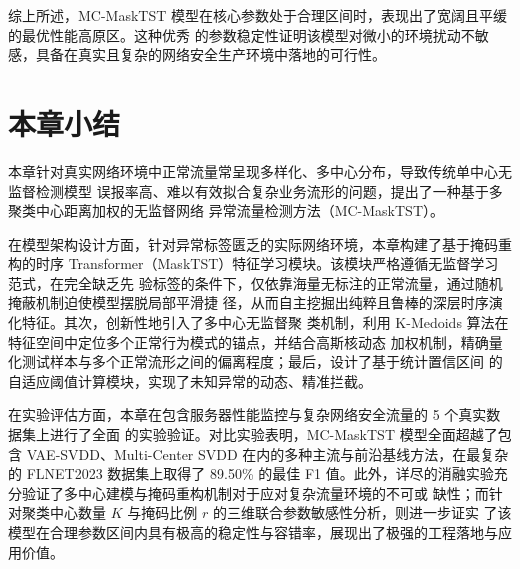 综上所述，MC-MaskTST 模型在核心参数处于合理区间时，表现出了宽阔且平缓的最优性能高原区。这种优秀
的参数稳定性证明该模型对微小的环境扰动不敏感，具备在真实且复杂的网络安全生产环境中落地的可行性。

\section{本章小结}
本章针对真实网络环境中正常流量常呈现多样化、多中心分布，导致传统单中心无监督检测模型
误报率高、难以有效拟合复杂业务流形的问题，提出了一种基于多聚类中心距离加权的无监督网络
异常流量检测方法（MC-MaskTST）。

在模型架构设计方面，针对异常标签匮乏的实际网络环境，本章构建了基于掩码重构的时序 
Transformer（MaskTST）特征学习模块。该模块严格遵循无监督学习范式，在完全缺乏先
验标签的条件下，仅依靠海量无标注的正常流量，通过随机掩蔽机制迫使模型摆脱局部平滑捷
径，从而自主挖掘出纯粹且鲁棒的深层时序演化特征。其次，创新性地引入了多中心无监督聚
类机制，利用 K-Medoids 算法在特征空间中定位多个正常行为模式的锚点，并结合高斯核动态
加权机制，精确量化测试样本与多个正常流形之间的偏离程度；最后，设计了基于统计置信区间
的自适应阈值计算模块，实现了未知异常的动态、精准拦截。

在实验评估方面，本章在包含服务器性能监控与复杂网络安全流量的 5 个真实数据集上进行了全面
的实验验证。对比实验表明，MC-MaskTST 模型全面超越了包含 VAE-SVDD、Multi-Center SVDD
在内的多种主流与前沿基线方法，在最复杂的 FLNET2023 数据集上取得了 89.50\% 的最佳 F1
值。此外，详尽的消融实验充分验证了多中心建模与掩码重构机制对于应对复杂流量环境的不可或
缺性；而针对聚类中心数量 $K$ 与掩码比例 $r$ 的三维联合参数敏感性分析，则进一步证实
了该模型在合理参数区间内具有极高的稳定性与容错率，展现出了极强的工程落地与应用价值。